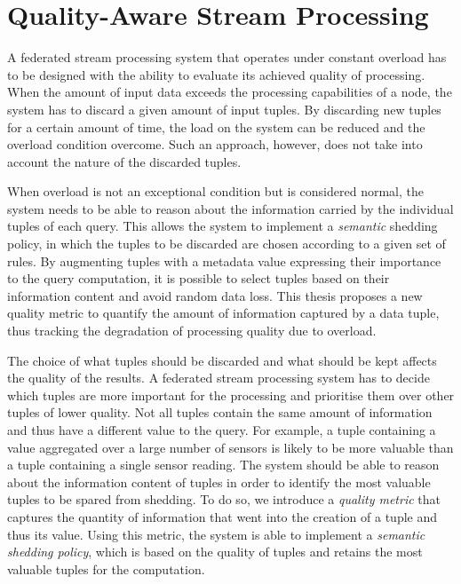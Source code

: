 \section{Quality-Aware Stream Processing}

A federated stream processing system that operates under constant overload has to be designed with the
ability to evaluate its achieved quality of processing. When
the amount of input data exceeds the processing capabilities of a node, the system has to discard a given amount of
input tuples. By discarding new tuples for a certain amount of time, the load on the
system can be reduced and the overload condition overcome. Such an approach, however, does not take into
account the nature of the discarded tuples. 

When overload is not an exceptional condition but is considered normal,
the system needs to be able to reason about the information carried by the individual tuples of each query. 
This allows the system to implement a \emph{semantic} shedding policy, in which the tuples to be
discarded are chosen according to a given set of rules.
By augmenting tuples with a metadata value expressing their importance to the query computation, it is
possible to select tuples based on their information content and avoid random data loss. 
This thesis proposes a new quality metric to quantify the amount of information captured by a data tuple,
thus tracking the degradation of processing quality due to overload.

The choice of what tuples should be discarded and what should be kept affects the quality of the
results. A federated stream processing system has to decide which tuples are more important for the
processing and prioritise them over other tuples of lower quality. Not all tuples contain the same
amount of information and thus have a different value to the query. For example, a tuple containing a
value aggregated over a large number of sensors is likely to be more valuable than a tuple containing a single sensor reading. The system should
be able to reason about the information content of tuples in order to identify the most valuable tuples to
be spared from shedding. To do so, we introduce a \emph{quality metric} that captures the
quantity of information that went into the creation of a tuple and thus its value. 
Using this metric, the system is able to implement a \emph{semantic shedding policy}, which is based on
the quality of tuples and retains the most valuable tuples for the computation.

